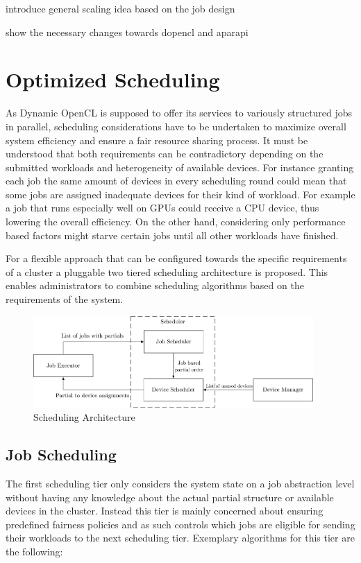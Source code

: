 introduce general scaling idea based on the job design

show the necessary changes towards dopencl and aparapi

\section{Optimized Scheduling}

As Dynamic OpenCL is supposed to offer its services to variously structured jobs in parallel, scheduling considerations have to be undertaken to maximize overall system efficiency and ensure a fair resource sharing process. It must be understood that both requirements can be contradictory depending on the submitted workloads and heterogeneity of available devices. For instance granting each job the same amount of devices in every scheduling round could mean that some jobs are assigned inadequate devices for their kind of workload. For example a job that runs especially well on GPUs could receive a CPU device, thus lowering the overall efficiency. On the other hand, considering only performance based factors might starve certain jobs until all other workloads have finished.

For a flexible approach that can be configured towards the specific requirements of a cluster a pluggable two tiered scheduling architecture is proposed. This enables administrators to combine scheduling algorithms based on the requirements of the system. 

\begin{figure}[!htb]
	\includegraphics[width=0.95\textwidth]{drawings/scheduling_arch.pdf}
	\centering
	\caption{Scheduling Architecture}
	\label{img:scheduling_arch}
\end{figure}

\subsection{Job Scheduling}
The first scheduling tier only considers the system state on a job abstraction level without having any knowledge about the actual partial structure or available devices in the cluster. Instead this tier is mainly concerned about ensuring predefined fairness policies and as such controls which jobs are eligible for sending their workloads to the next scheduling tier. Exemplary algorithms for this tier are the following:


